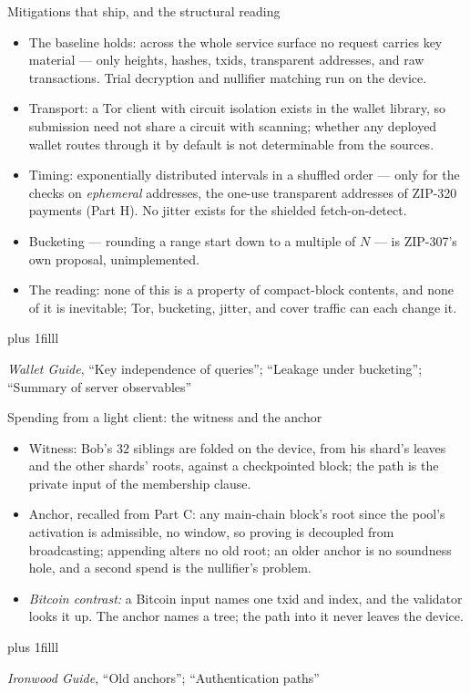 \documentclass[aspectratio=169,11pt]{beamer}
\newcommand{\src}[1]{\par\vskip0pt plus 1filll
  {\fontsize{6}{7.2}\selectfont\color{arbdim}\raggedright #1\par}}
\begin{document}
\begin{frame}{Mitigations that ship, and the structural reading}
\begin{itemize}
  \item The baseline holds: across the whole service surface no request
    carries key material --- only heights, hashes, txids, transparent
    addresses, and raw transactions. Trial decryption and nullifier
    matching run on the device.
  \item Transport: a Tor client with circuit isolation exists in the
    wallet library, so submission need not share a circuit with
    scanning; whether any deployed wallet routes through it by default
    is not determinable from the sources.
  \item Timing: exponentially distributed intervals in a shuffled order
    --- only for the checks on \emph{ephemeral} addresses, the one-use
    transparent addresses of ZIP-320 payments (Part H). No jitter exists
    for the shielded fetch-on-detect.
  \item Bucketing --- rounding a range start down to a multiple of $N$
    --- is ZIP-307's own proposal, unimplemented.
  \item The reading: none of this is a property of compact-block
    contents, and none of it is inevitable; Tor, bucketing, jitter, and
    cover traffic can each change it.
\end{itemize}
\src{\emph{Wallet Guide}, ``Key independence of queries''; ``Leakage under
  bucketing''; ``Summary of server observables''}
\end{frame}

\begin{frame}{Spending from a light client: the witness and the anchor}
\begin{itemize}
  \item Witness: Bob's $32$ siblings are folded on the device, from his
    shard's leaves and the other shards' roots, against a checkpointed
    block; the path is the private input of the membership clause.
  \item Anchor, recalled from Part C: any main-chain block's root since
    the pool's activation is admissible, no window, so proving is
    decoupled from broadcasting; appending alters no old root; an older
    anchor is no soundness hole, and a second spend is the nullifier's
    problem.
  \item \emph{Bitcoin contrast:} a Bitcoin input names one txid and index,
    and the validator looks it up. The anchor names a tree; the path into
    it never leaves the device.
\end{itemize}
\src{\emph{Ironwood Guide}, ``Old anchors''; ``Authentication paths''}
\end{frame}
\end{document}
